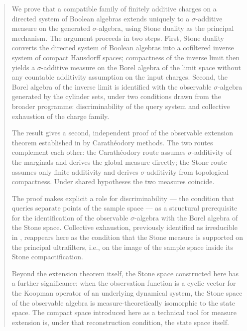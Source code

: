 
\maketitle

\begin{abstract}
We prove that a compatible family of finitely additive charges on a directed system
of Boolean algebras extends uniquely to a $\sigma$-additive measure on the generated
$\sigma$-algebra, using Stone duality as the principal mechanism.  The argument
proceeds in two steps.  First, Stone duality converts the directed system of Boolean
algebras into a cofiltered inverse system of compact Hausdorff spaces; compactness of
the inverse limit then yields a $\sigma$-additive measure on the Borel algebra of the
limit space without any countable additivity assumption on the input charges.  Second,
the Borel algebra of the inverse limit is identified with the observable $\sigma$-algebra
generated by the cylinder sets, under two conditions drawn from the broader
programme: discriminability of the query system and collective exhaustion of the
charge family.

The result gives a second, independent proof of the observable extension theorem
established in \cite{mahon_paper0} by Carath\'{e}odory methods.  The two routes
complement each other: the Carath\'{e}odory route assumes $\sigma$-additivity of the
marginals and derives the global measure directly; the Stone route assumes only finite
additivity and derives $\sigma$-additivity from topological compactness.  Under shared
hypotheses the two measures coincide.

The proof makes explicit a role for discriminability --- the condition that queries
separate points of the sample space --- as a structural prerequisite for the
identification of the observable $\sigma$-algebra with the Borel algebra of the Stone
space.  Collective exhaustion, previously identified as irreducible in
\cite{mahon_paper0}, reappears here as the condition that the Stone measure is
supported on the principal ultrafilters, i.e., on the image of the sample space
inside its Stone compactification.

Beyond the extension theorem itself, the Stone space constructed here has a further
significance: when the observation function is a cyclic vector for the Koopman
operator of an underlying dynamical system, the Stone space of the observable algebra
is measure-theoretically isomorphic to the state space.  The compact space introduced
here as a technical tool for measure extension is, under that reconstruction condition,
the state space itself.
\end{abstract}

